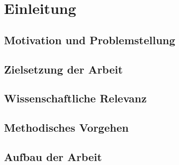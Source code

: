 \section{Einleitung}

\subsection{Motivation und Problemstellung}

\subsection{Zielsetzung der Arbeit}

\subsection{Wissenschaftliche Relevanz}

\subsection{Methodisches Vorgehen}

\subsection{Aufbau der Arbeit}